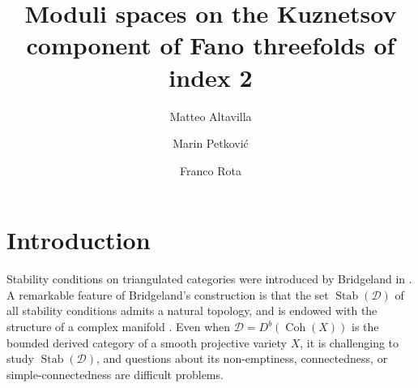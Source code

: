 \documentclass[11pt]{amsart}
\title{Moduli spaces on the Kuznetsov component of Fano threefolds of index 2}
\author{Matteo Altavilla}
\author{Marin Petkovi\'{c}}
\author{Franco Rota}
\theoremstyle{definition}
\DeclareMathOperator{\Stab}{Stab}
\DeclareMathOperator{\Coh}{Coh}
\newcommand{\sD}{\mathcal{D}}
\begin{document}


\maketitle


\begin{prelims}

\DisplayAbstractInEnglish

\bigskip

\DisplayKeyWords

\medskip

\DisplayMSCclass







\end{prelims}



\newpage

\setcounter{tocdepth}{1}

\tableofcontents




\section{Introduction}\label{sec_intro}

Stability conditions on triangulated categories were introduced by Bridgeland in \cite{Bri07_triang_cat}. 
A remarkable feature of Bridgeland's construction is that the set $\Stab(\sD)$ of all stability conditions admits a natural topology, and is endowed with the structure of a complex manifold \cite[Theorem~1.2]{Bri07_triang_cat}. Even when $\sD=D^b(\Coh(X))$ is the bounded derived category of a smooth projective variety $X$, it is challenging to study $\Stab(\sD)$, and questions about its non-emptiness, connectedness, or simple-connectedness are difficult problems. 
\end{document}
